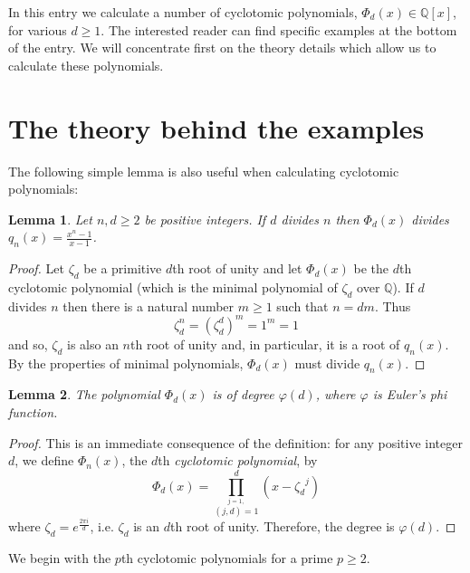 \documentclass[12pt]{article}
\newtheorem{lemma}{Lemma}
\theoremstyle{definition}
\newcommand{\Rats}{\mathbb{Q}}
\begin{document}
In this entry we calculate a number of cyclotomic polynomials, $\Phi_d(x)\in\Rats[x]$, for various $d\geq 1$. The interested reader can find specific examples at the bottom of the entry. We will concentrate first on the theory details which allow us to calculate these polynomials. 

\section{The theory behind the examples}
The following simple lemma is also useful when calculating cyclotomic polynomials:
\begin{lemma}
Let $n,d\geq 2$ be positive integers. If $d$ divides $n$ then $\Phi_d(x)$ divides $q_n(x)=\frac{x^n-1}{x-1}$.
\end{lemma}
\begin{proof}
Let $\zeta_d$ be a primitive $d$th root of unity and let $\Phi_d(x)$ be the $d$th cyclotomic polynomial (which is the minimal polynomial of $\zeta_d$ over $\Rats$). If $d$ divides $n$ then there is a natural number $m\geq 1$ such that $n=dm$. Thus 
$$\zeta_d^n=(\zeta_d^d)^m=1^m=1$$
and so, $\zeta_d$ is also an $n$th root of unity and, in particular, it is a root of $q_n(x)$. By the properties of minimal polynomials, $\Phi_d(x)$ must divide $q_n(x)$.  
\end{proof}

\begin{lemma}
The polynomial $\Phi_d(x)$ is of degree $\varphi(d)$, where $\varphi$ is Euler's phi function.
\end{lemma}
\begin{proof}
This is an immediate consequence of the definition: for any positive integer $d$, we define $\Phi_n(x)$, the $d$th {\em cyclotomic
polynomial}, by
\[\Phi_d(x)=\prod_{\stackrel{j=1,}{\scriptscriptstyle{(j,d)=1}}}^d(x-{\zeta_d}^j)\]
where $\zeta_d=e^{\frac{2\pi i}{d}}$, i.e. $\zeta_d$ is an $d$th root of unity. Therefore, the degree is $\varphi(d)$.
\end{proof}

We begin with the $p$th cyclotomic polynomials for a prime $p\geq 2$.
\end{document}
